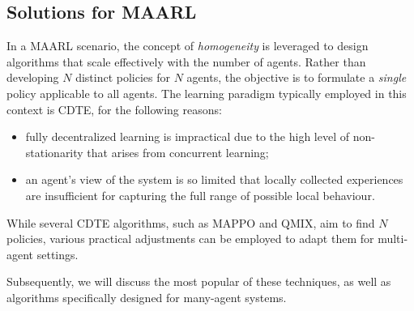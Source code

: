 \subsection{Solutions for \ac{MAARL}}\label{sec:manyrl:solutions}
In a \ac{MAARL} scenario, 
 the concept of \emph{homogeneity} is leveraged to design algorithms that scale effectively with the number of agents. 
 Rather than developing $N$ distinct policies for $N$ agents, 
 the objective is to formulate a \emph{single} policy applicable to all agents.
%
The learning paradigm typically employed in this context is CDTE, for the following reasons:
\begin{itemize}
\item fully decentralized learning is impractical due to the high level of non-stationarity 
 that arises from concurrent learning;
\item an agent's view of the system is so limited that locally 
 collected experiences are insufficient for capturing the full range of possible local behaviour.
\end{itemize}
While several CDTE algorithms, such as MAPPO and QMIX, aim to find $N$ policies, 
 various practical adjustments can be employed to adapt them for multi-agent settings. 

Subsequently, we will discuss the most popular of these techniques, as well as algorithms specifically designed for many-agent systems.
